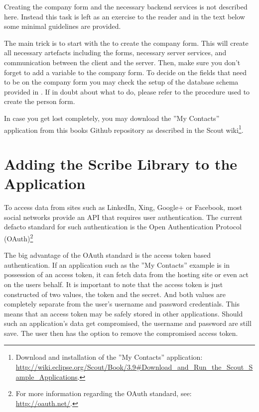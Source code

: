 \documentclass[a4paper,10pt,twoside]{book}
\begin{document}
Creating the company form and the necessary backend services is not described here.
Instead this task is left as an exercise to the reader and in the text below some minimal guidelines are provided.

The main trick is to start with the  to create the company form. 
This will create all necessary artefacts including the forms, necessary server services, and communication between the client and the server. 
Then, make sure you don't forget to add a variable  to the company form. 
To decide on the fields that need to be on the company form you may check the setup of the database schema provided in . 
If in doubt about what to do, please refer to the procedure used to create the person form. 

In case you get lost completely, you may download the ''My Contacts'' application from this books Github repository as described in the Scout wiki\footnote{
Download and installation of the ''My Contacts'' application: \url{http://wiki.eclipse.org/Scout/Book/3.9\#Download_and_Run_the_Scout_Sample_Applications}.
}.

\section{Adding the Scribe Library to the Application}

To access data from sites such as LinkedIn, Xing, Google+ or Facebook, most social networks provide an API that requires user authentication. 
The current defacto standard for such authentication is the Open Authentication Protocol (OAuth)\footnote{
For more information regarding the OAuth standard, see: \url{http://oauth.net/}.
} 

The big advantage of the OAuth standard is the access token based authentication. 
If an application such as the ''My Contacts'' example is in possession of an access token, it can fetch data from the hosting site or even act on the users behalf. 
It is important to note that the access token is just constructed of two values, the token and the secret.
And both values are completely separate from the user's username and password credentials. 
This means that an access token may be safely stored in other applications. 
Should such an application's data get compromised, the username and password are still save.
The user then has the option to remove the compromised access token.  
\end{document}

